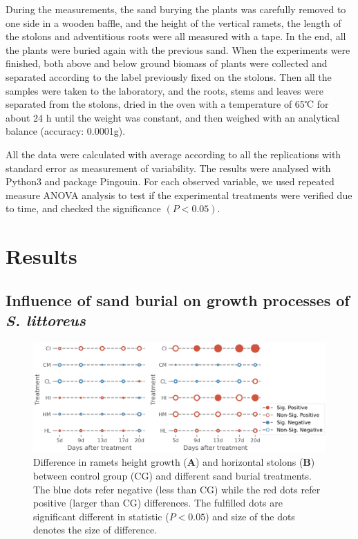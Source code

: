 \documentclass[]{interact}
\theoremstyle{plain}%
\theoremstyle{definition}
\theoremstyle{remark}
\begin{document}
During the measurements, the sand burying the plants was carefully removed to one side in a wooden baffle, and the height of the vertical ramets, the length of the stolons and adventitious roots were all measured with a tape. In the end, all the plants were buried again with the previous sand. When the experiments were finished, both above and below ground biomass of plants were collected and separated according to the label previously fixed on the stolons. Then all the samples were taken to the laboratory, and the roots, stems and leaves were separated from the stolons, dried in the oven with a temperature of 65℃ for about 24 h until the weight was constant, and then weighed with an analytical balance (accuracy: 0.0001g).

All the data were calculated with average according to all the replications with standard error as measurement of variability. The results were analysed with Python3 and package Pingouin. For each observed variable, we used repeated measure ANOVA analysis to test if the experimental treatments were verified due to time, and checked the significance $(P<0.05)$.

\section{Results}

\subsection{Influence of sand burial on growth processes of \textit{S. littoreus}}

\begin{figure}[!h]
  \centering
  \includegraphics[scale=0.8]{../figs/grid_differences.jpg}
  \caption{
    Difference in ramets height growth (\textbf{A}) and horizontal stolons (\textbf{B}) between control group (CG) and different sand burial treatments. The blue dots refer negative (less than CG) while the red dots refer positive (larger than CG) differences. The fulfilled dots are significant different in statistic ($P<0.05$) and size of the dots denotes the size of difference.  
  } 
  \label{fig:lattice}
\end{figure}
\end{document}
